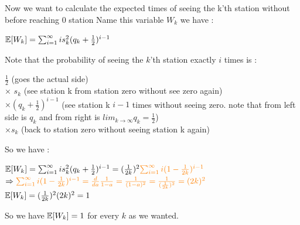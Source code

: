 \documentclass[30pt]{article}
\begin{document}
Now we want to calculate the expected times of seeing the k'th station without before reaching 0 station Name this variable $W_k$ we have : \\
\begin{center}
    $\Bbb{E}[W_k] = \sum_{i=1}^{\infty} i s_k^2(q_k + \frac{1}{2})^{i-1} $
\end{center} 
Note that the probability of seeing the $k$'th station exactly $i$ times is : 
\begin{center}
    $\frac{1}{2}$ (goes the actual side) \vspace{0.3cm} \\
    $\times$ $s_k$ (see station k from station zero without see zero again) \vspace{0.3cm} \\
    $\times (q_k + \frac{1}{2})^{i-1} $ (see station k $i-1$ times without seeing zero. note that from left side is $q_{k}$ and from right is $lim_{k \to \infty} q_k = \frac{1}{2} $) \vspace{0.3cm} \\
    $\times s_k$  (back to station zero without seeing station k again)
\end{center}    
So we have : \\
\begin{center}
    $\Bbb{E}[W_k] = \sum_{i=1}^{\infty} i s_k^2(q_k + \frac{1}{2})^{i-1} = (\frac{1}{2k})^2 {\color{orange} \sum_{i=1}^{\infty} i (1 - \frac{1}{2k})^{i-1}} $ \vspace{0.3cm} \\
    $\Rightarrow {\color{orange} \sum_{i=1}^{\infty} i (1 - \frac{1}{2k})^{i-1} = \frac{d}{da} \frac{1}{1 - a} = \frac{1}{(1-a)^2} = \frac{1}{(\frac{1}{2k})^2} = (2k)^2 }$ \vspace{0.4cm} \\
    $\Bbb{E}[W_k] = (\frac{1}{2k})^2 (2k)^2 = 1 $
\end{center}
So we have $\Bbb{E}[W_k] = 1 $ for every $k$ as we wanted. \\
\end{document}
